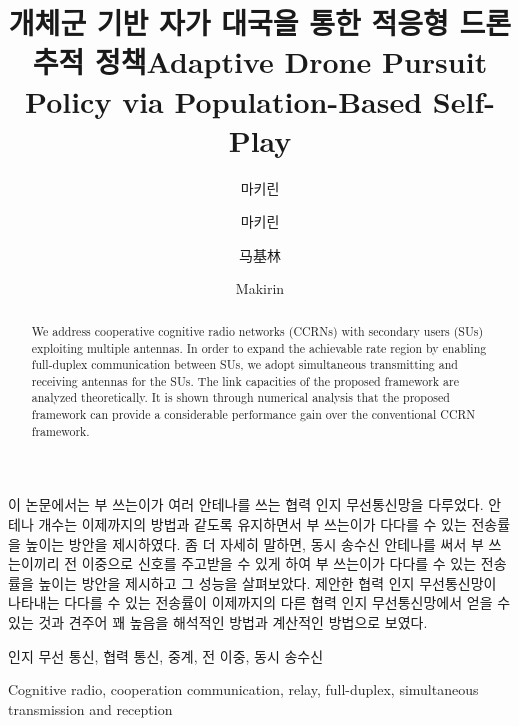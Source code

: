 \documentclass[master,english,final]{kaist-ucs}
\title[korean] {개체군 기반 자가 대국을 통한 적응형 드론 추적 정책}
\title[english]{Adaptive Drone Pursuit Policy via Population-Based Self-Play}
\author[korean]{마키린}{무하마드 카이룰}
\author[korean2]{마키린}{무하마드 카이룰}    %
\author[chinese]{马基林}{穆罕默德 凯鲁尔}
\author[english]{Makirin}{Muhammad Khairul}
\begin{document}

\thesisinfo
\begin{summary}
    이 논문에서는 부 쓰는이가 여러 안테나를 쓰는 협력 인지 무선통신망을 다루었다. 안테나 개수는 이제까지의 방법과 같도록 유지하면서 부 쓰는이가 다다를 수 있는 전송률을 높이는 방안을 제시하였다. 좀 더 자세히 말하면, 동시 송수신 안테나를 써서 부 쓰는이끼리 전 이중으로 신호를 주고받을 수 있게 하여 부 쓰는이가 다다를 수 있는 전송률을 높이는 방안을 제시하고 그 성능을 살펴보았다. 제안한 협력 인지 무선통신망이 나타내는 다다를 수 있는 전송률이 이제까지의 다른 협력 인지 무선통신망에서 얻을 수 있는 것과 견주어 꽤 높음을 해석적인 방법과 계산적인 방법으로 보였다.

\end{summary}

\begin{Korkeyword}
    인지 무선 통신, 협력 통신, 중계, 전 이중, 동시 송수신
\end{Korkeyword}


\begin{abstract}
    We address cooperative cognitive radio networks (CCRNs) with secondary users (SUs) exploiting multiple antennas. In order to expand the achievable rate region by enabling full-duplex communication between SUs, we adopt simultaneous transmitting and receiving antennas for the SUs. The link capacities of the proposed framework are analyzed theoretically. It is shown through numerical analysis that the proposed framework can provide a considerable performance gain over the conventional CCRN framework.
\end{abstract}

\begin{Engkeyword}
    Cognitive radio, cooperation communication, relay, full-duplex, simultaneous transmission and reception
\end{Engkeyword}


\addtocounter{pagemarker}{1}                 %
\newpage
\end{document}

